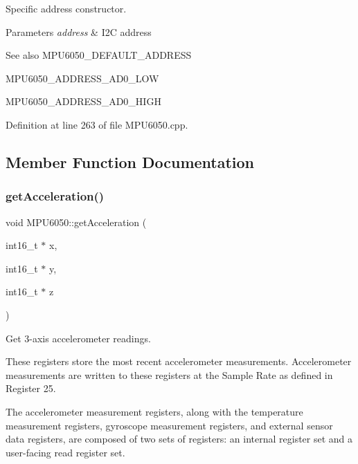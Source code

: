 Specific address constructor. 


\begin{DoxyParams}{Parameters}
{\em address} & I2C address \\
\hline
\end{DoxyParams}
\begin{DoxySeeAlso}{See also}
M\+P\+U6050\+\_\+\+D\+E\+F\+A\+U\+L\+T\+\_\+\+A\+D\+D\+R\+E\+SS 

M\+P\+U6050\+\_\+\+A\+D\+D\+R\+E\+S\+S\+\_\+\+A\+D0\+\_\+\+L\+OW 

M\+P\+U6050\+\_\+\+A\+D\+D\+R\+E\+S\+S\+\_\+\+A\+D0\+\_\+\+H\+I\+GH 
\end{DoxySeeAlso}


Definition at line 263 of file M\+P\+U6050.\+cpp.



\subsection{Member Function Documentation}
\mbox{\label{classMPU6050_a658dfc7e35b7fdba360a75f137bde33a}} 
\subsubsection{\texorpdfstring{getAcceleration()}{getAcceleration()}}
{\footnotesize\ttfamily void M\+P\+U6050\+::get\+Acceleration (\begin{DoxyParamCaption}\item[{int16\+\_\+t $\ast$}]{x,  }\item[{int16\+\_\+t $\ast$}]{y,  }\item[{int16\+\_\+t $\ast$}]{z }\end{DoxyParamCaption})}



Get 3-\/axis accelerometer readings. 

These registers store the most recent accelerometer measurements. Accelerometer measurements are written to these registers at the Sample Rate as defined in Register 25.

The accelerometer measurement registers, along with the temperature measurement registers, gyroscope measurement registers, and external sensor data registers, are composed of two sets of registers\+: an internal register set and a user-\/facing read register set.

